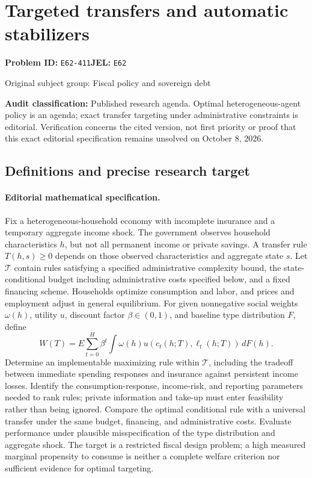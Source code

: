 \documentclass[11pt,a4paper]{article}
\begin{document}
\section*{Targeted transfers and automatic stabilizers}
\textbf{Problem ID:} \texttt{E62-411}\quad \textbf{JEL:} \texttt{E62}\par
\label{problem:OP-0253}
{\sffamily\small\color{muted}Original subject group: Fiscal policy and sovereign debt\par}
\label{definitions:problem:30007534}
\textbf{Audit classification:} Published research agenda. Optimal heterogeneous-agent policy is an agenda; exact transfer targeting under administrative constraints is editorial. Verification concerns the cited version, not first priority or proof that this exact editorial specification remains unsolved on October 8, 2026.
\subsection*{Definitions and precise research target}
\paragraph{Editorial mathematical specification.} Fix a heterogeneous-household economy with incomplete insurance and a temporary aggregate income shock. The government observes household characteristics \(h\), but not all permanent income or private savings. A transfer rule \(T(h,s)\ge0\) depends on those observed characteristics and aggregate state \(s\). Let \(\mathcal T\) contain rules satisfying a specified administrative complexity bound, the state-conditional budget including administrative costs specified below, and a fixed financing scheme. Households optimize consumption and labor, and prices and employment adjust in general equilibrium.
For given nonnegative social weights \(\omega(h)\), utility \(u\), discount factor \(\beta\in(0,1)\), and baseline type distribution \(F\), define
\[
W(T)=E\sum_{t=0}^{H}\beta^t
\int\omega(h)u(c_t(h;T),\ell_t(h;T))\,dF(h).
\]
Determine an implementable maximizing rule within \(\mathcal T\), including the tradeoff between immediate spending responses and insurance against persistent income losses. Identify the consumption-response, income-risk, and reporting parameters needed to rank rules; private information and take-up must enter feasibility rather than being ignored. Compare the optimal conditional rule with a universal transfer under the same budget, financing, and administrative costs. Evaluate performance under plausible misspecification of the type distribution and aggregate shock. The target is a restricted fiscal design problem; a high measured marginal propensity to consume is neither a complete welfare criterion nor sufficient evidence for optimal targeting.
\end{document}

